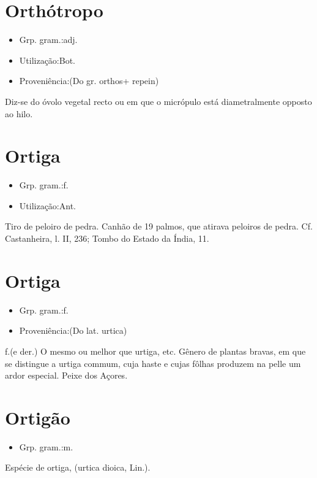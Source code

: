 \section{Orthótropo}
\begin{itemize}
\item {Grp. gram.:adj.}
\end{itemize}
\begin{itemize}
\item {Utilização:Bot.}
\end{itemize}
\begin{itemize}
\item {Proveniência:(Do gr. \textunderscore orthos\textunderscore  + \textunderscore repein\textunderscore )}
\end{itemize}
Diz-se do óvolo vegetal recto ou em que o micrópulo está diametralmente opposto ao hilo.
\section{Ortiga}
\begin{itemize}
\item {Grp. gram.:f.}
\end{itemize}
\begin{itemize}
\item {Utilização:Ant.}
\end{itemize}
Tiro de peloiro de pedra.
Canhão de 19 palmos, que atirava peloiros de pedra. Cf. Castanheira, l. II, 236; \textunderscore Tombo do Estado da Índia\textunderscore , 11.
\section{Ortiga}
\begin{itemize}
\item {Grp. gram.:f.}
\end{itemize}
\begin{itemize}
\item {Proveniência:(Do lat. \textunderscore urtica\textunderscore )}
\end{itemize}
\textunderscore f.\textunderscore  (e der.)
O mesmo ou melhor que \textunderscore urtiga\textunderscore , etc.
Gênero de plantas bravas, em que se distingue a urtiga commum, cuja haste e cujas fôlhas produzem na pelle um ardor especial.
Peixe dos Açores.
\section{Ortigão}
\begin{itemize}
\item {Grp. gram.:m.}
\end{itemize}
Espécie de ortiga, (\textunderscore urtica dioica\textunderscore , Lin.).
